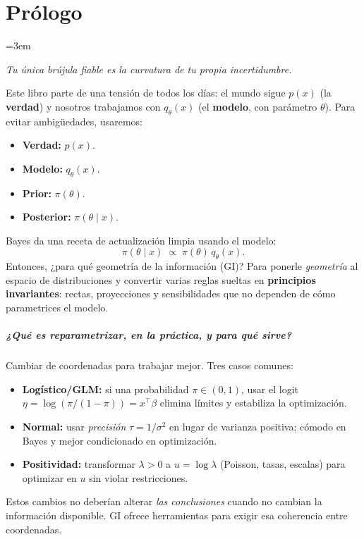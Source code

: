 \documentclass[12pt,letterpaper]{book}
\begin{document}
\chapter*{Prólogo}

\begingroup
\setlength{\parindent}{0pt}
\setlength{\parskip}{6pt}
\emergencystretch=3em
\sloppy

\begin{flushright}
	\emph{\guillemotleft Tu única brújula fiable es la curvatura de tu propia incertidumbre.\guillemotright}
\end{flushright}

Este libro parte de una tensión de todos los días: el mundo sigue $p(x)$ (la \textbf{verdad}) y nosotros trabajamos con $q_\theta(x)$ (el \textbf{modelo}, con parámetro $\theta$).
Para evitar ambigüedades, usaremos:
\begin{itemize}
	\item \textbf{Verdad:} $p(x)$.
	\item \textbf{Modelo:} $q_\theta(x)$.
	\item \textbf{Prior:} $\pi(\theta)$.
	\item \textbf{Posterior:} $\pi(\theta\mid x)$.
\end{itemize}

Bayes da una receta de actualización limpia usando el modelo:
\[
\pi(\theta\mid x)\;\propto\;\pi(\theta)\,q_\theta(x).
\]
Entonces, ¿para qué geometría de la información (GI)? Para ponerle \emph{geometría} al espacio de distribuciones y convertir varias reglas sueltas en \textbf{principios invariantes}: rectas, proyecciones y sensibilidades que no dependen de cómo parametrices el modelo.

\paragraph{¿Qué es reparametrizar, en la práctica, y para qué sirve?}
Cambiar de coordenadas para trabajar mejor. Tres casos comunes:
\begin{itemize}
	\item \textbf{Logístico/GLM:} si una probabilidad $\pi\in(0,1)$, usar el logit $\eta=\log(\pi/(1-\pi))=x^{\top}\beta$ elimina límites y estabiliza la optimización.
	\item \textbf{Normal:} usar \emph{precisión} $\tau=1/\sigma^2$ en lugar de varianza positiva; cómodo en Bayes y mejor condicionado en optimización.
	\item \textbf{Positividad:} transformar $\lambda>0$ a $u=\log\lambda$ (Poisson, tasas, escalas) para optimizar en $u$ sin violar restricciones.
\end{itemize}
Estos cambios no deberían alterar \emph{las conclusiones} cuando no cambian la información disponible. GI ofrece herramientas para exigir esa coherencia entre coordenadas.
\end{document}
